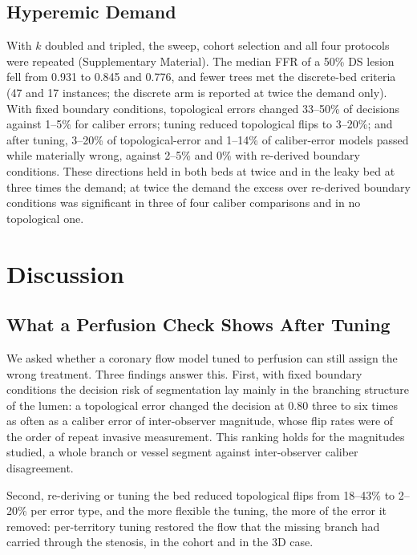 \documentclass[journal]{IEEEtran}
\begin{document}
\subsection{Hyperemic Demand}\label{sec:demand}
With $k$ doubled and tripled, the sweep, cohort selection and all four protocols were repeated (Supplementary
Material). The median FFR of a 50\% DS lesion fell from 0.931 to 0.845 and 0.776, and fewer trees met the discrete-bed
criteria (47 and 17 instances; the discrete arm is reported at twice the demand only).
With fixed boundary conditions, topological errors changed 33--50\% of decisions against 1--5\% for caliber errors;
tuning reduced topological flips to 3--20\%; and after tuning, 3--20\% of topological-error and 1--14\% of
caliber-error models passed while materially wrong, against 2--5\% and 0\% with re-derived boundary conditions. These
directions held in both beds at twice and in the leaky bed at three times the demand; at twice the demand the
excess over re-derived boundary conditions was significant in three of four caliber comparisons and in no
topological one.

\section{Discussion}
\subsection{What a Perfusion Check Shows After Tuning}
We asked whether a coronary flow model tuned to perfusion can still assign the wrong treatment. Three findings
answer this. First, with fixed boundary conditions the decision risk of segmentation lay mainly in the branching
structure of the lumen: a topological error changed the decision at 0.80 three to six times as often as a caliber
error of inter-observer magnitude, whose flip rates were of the order of repeat invasive measurement. This ranking
holds for the magnitudes studied, a whole branch or vessel segment against inter-observer caliber disagreement.

Second, re-deriving or tuning the bed reduced topological flips from 18--43\% to 2--20\% per error type, and the
more flexible the tuning, the more of the error it removed: per-territory tuning restored the flow that the missing
branch had carried through the stenosis, in the cohort and in the 3D case.
\end{document}
